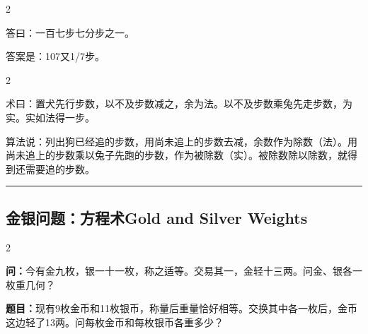 \documentclass[11pt,a4paper]{article}
\newcommand{\longline}{\noindent\rule{\textwidth}{0.4pt}}
\newcommand{\bilingualsubsection}[2]{%
  \subsection{#1\hfill\normalfont\normalsize\color{sectioncolor}#2}%
}
\begin{document}
\vspace{0.2cm}

\begin{paracol}{2}

\begin{answerbox}[\CJKfamily{rm}答 · 原文]
答曰：一百七步七分步之一。
\end{answerbox}

\switchcolumn

\begin{answerbox}[白话文：答案]
答案是：107又1/7步。
\end{answerbox}

\end{paracol}

\vspace{0.2cm}

\begin{paracol}{2}

\begin{methodbox}[\CJKfamily{rm}术 · 原文]
术曰：置犬先行步数，以不及步数减之，余为法。以不及步数乘兔先走步数，为实。实如法得一步。
\end{methodbox}

\switchcolumn

\begin{methodbox}
算法说：列出狗已经追的步数，用尚未追上的步数去减，余数作为除数（法）。用尚未追上的步数乘以兔子先跑的步数，作为被除数（实）。被除数除以除数，就得到还需要追的步数。
\end{methodbox}

\end{paracol}

\vspace{0.5cm}
\longline
\vspace{0.3cm}

\bilingualsubsection{金银问题：方程术}{Gold and Silver Weights}

\begin{paracol}{2}

\begin{problembox}[\CJKfamily{rm}金银 · 原文]
\textbf{问：}今有金九枚，银一十一枚，称之适等。交易其一，金轻十三两。问金、银各一枚重几何？
\end{problembox}

\switchcolumn

\begin{problembox}
\textbf{题目：}现有9枚金币和11枚银币，称量后重量恰好相等。交换其中各一枚后，金币这边轻了13两。问每枚金币和每枚银币各重多少？
\end{problembox}

\end{paracol}
\end{document}
